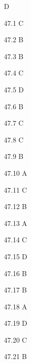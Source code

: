\begin{Solution}{47}
D
\end{Solution}
\begin{Solution}{47.{1}}
C
\end{Solution}
\begin{Solution}{47.{2}}
B
\end{Solution}
\begin{Solution}{47.{3}}
B
\end{Solution}
\begin{Solution}{47.{4}}
C
\end{Solution}
\begin{Solution}{47.{5}}
D
\end{Solution}
\begin{Solution}{47.{6}}
B
\end{Solution}
\begin{Solution}{47.{7}}
C
\end{Solution}
\begin{Solution}{47.{8}}
C
\end{Solution}
\begin{Solution}{47.{9}}
B
\end{Solution}
\begin{Solution}{47.{10}}
A
\end{Solution}
\begin{Solution}{47.{11}}
C
\end{Solution}
\begin{Solution}{47.{12}}
B
\end{Solution}
\begin{Solution}{47.{13}}
A
\end{Solution}
\begin{Solution}{47.{14}}
C
\end{Solution}
\begin{Solution}{47.{15}}
D
\end{Solution}
\begin{Solution}{47.{16}}
B
\end{Solution}
\begin{Solution}{47.{17}}
B
\end{Solution}
\begin{Solution}{47.{18}}
A
\end{Solution}
\begin{Solution}{47.{19}}
D
\end{Solution}
\begin{Solution}{47.{20}}
C
\end{Solution}
\begin{Solution}{47.{21}}
B
\end{Solution}
